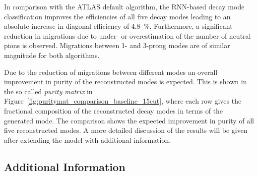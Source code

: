 In comparison with the ATLAS default algorithm, the RNN-based decay mode
classification improves the efficiencies of all five decay modes leading to an
absolute increase in diagonal efficiency of \SI{4.8}{\percent}. Furthermore, a
significant reduction in migrations due to under- or overestimation of the
number of neutral pions is observed. Migrations between 1- and 3-prong modes are
of similar magnitude for both algorithms.

Due to the reduction of migrations between different modes an overall
improvement in purity of the reconstructed modes is expected. This is shown in
the so called \emph{purity matrix} in
Figure~\ref{fig:puritymat_comparison_baseline_15cut}, where each row gives the
fractional composition of the reconstructed decay modes in terms of the
generated mode. The comparison shows the expected improvement in purity of all
five reconstructed modes. A more detailed discussion of the results will be
given after extending the model with additional information.

\subsection{Additional Information}
\label{sec:add_info}


